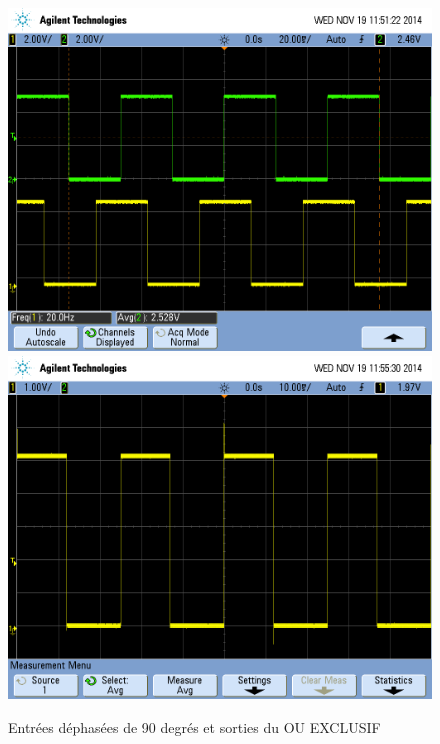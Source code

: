 \documentclass[../../Cours_M1.tex]{subfiles}
\begin{document}
\begin{figure}[h!]
\centering
\includegraphics[scale=0.2]{AATC/II90.PNG}
\includegraphics[scale=0.2]{AATC/II90XOR.PNG}
\caption{Entrées déphasées de 90 degrés et sorties du OU EXCLUSIF}
\end{figure}
\end{document}

